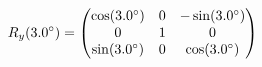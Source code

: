 \documentclass[preview]{standalone}
\begin{document}
\begin{align*}
\special{dvisvgm:raw <g id='unique000'>}R_y(3.0^\circ) = \begin{pmatrix} \cos(3.0^\circ) & 0 & -\sin(3.0^\circ) \\ 0 & 1 & 0 \\ \sin(3.0^\circ) & 0 & \cos(3.0^\circ) \end{pmatrix}\special{dvisvgm:raw </g>}
\end{align*}
\end{document}
